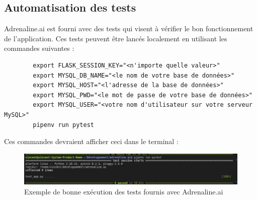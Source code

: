 \documentclass[french]{article}
\begin{document}
    \subsection{Automatisation des tests}
    Adrenaline.ai est fourni avec des tests qui visent à vérifier le bon fonctionnement de l'application. Ces tests peuvent être lancés localement en utilisant les commandes suivantes :
    \begin{verbatim}
        export FLASK_SESSION_KEY="<n'importe quelle valeur>"
        export MYSQL_DB_NAME="<le nom de votre base de données>"
        export MYSQL_HOST="<l'adresse de la base de données>"
        export MYSQL_PWD="<le mot de passe de votre base de données>"
        export MYSQL_USER="<votre nom d'utilisateur sur votre serveur MySQL>"
        pipenv run pytest
    \end{verbatim}

    Ces commandes devraient afficher ceci dans le terminal :
    \begin{figure}[h!]
        \includegraphics[width=12cm]{tests}
        \centering
        \caption{Exemple de bonne exécution des tests fournis avec Adrenaline.ai}
        \centering
    \end{figure}
\end{document}
